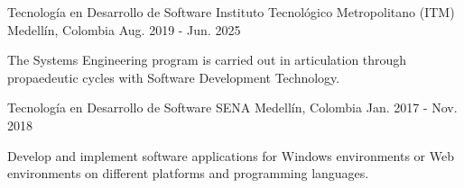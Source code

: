 

\begin{cventries}

  \cventry
    {Tecnología en Desarrollo de Software} %
    {Instituto Tecnológico Metropolitano (ITM)} %
    {Medellín, Colombia} %
    {Aug. 2019 - Jun. 2025} %
    {
      \begin{cvitems} %
        \item {The Systems Engineering program is carried out in articulation through propaedeutic cycles with Software Development Technology.}
      \end{cvitems}
    }

  \cventry
    {Tecnología en Desarrollo de Software} %
    {SENA} %
    {Medellín, Colombia} %
    {Jan. 2017 - Nov. 2018} %
    {
      \begin{cvitems} %
        \item {Develop and implement software applications for Windows environments or Web environments on different platforms and programming languages.}
      \end{cvitems}
    }
\end{cventries}
